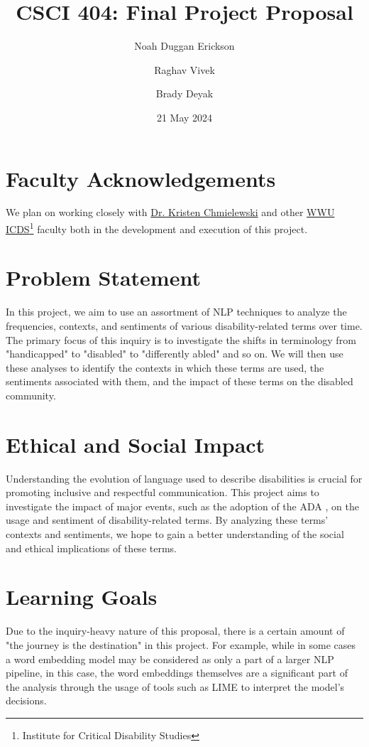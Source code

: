 \documentclass[letterpaper, twoside]{article}
\title{CSCI 404: Final Project Proposal}
\author{Noah Duggan Erickson \and Raghav Vivek \and Brady Deyak}
\date{21 May 2024}
\begin{document}
\maketitle

\section*{Faculty Acknowledgements}
We plan on working closely with \href{https://chss.wwu.edu/chmielk}{Dr. Kristen Chmielewski} and other \href{https://wp.wwu.edu/disabilitycollaborative/people/}{WWU ICDS\footnote{Institute for Critical Disability Studies} faculty} both in the development and execution of this project.

\section{Problem Statement}
In this project, we aim to use an assortment of NLP techniques to analyze the frequencies, contexts, and sentiments of various disability-related terms over time. The primary focus of this inquiry is to investigate the shifts in terminology from "handicapped" to "disabled" to "differently abled" and so on. We will then use these analyses to identify the contexts in which these terms are used, the sentiments associated with them, and the impact of these terms on the disabled community.
\section{Ethical and Social Impact}
Understanding the evolution of language used to describe disabilities is crucial for promoting inclusive and respectful communication. This project aims to investigate the impact of major events, such as the adoption of the ADA \cite{grey-ada}, on the usage and sentiment of disability-related terms. By analyzing these terms' contexts and sentiments, we hope to gain a better understanding of the social and ethical implications of these terms.
\section{Learning Goals}
Due to the inquiry-heavy nature of this proposal, there is a certain amount of "the journey is the destination" in this project. For example, while in some cases a word embedding model may be considered as only a part of a larger NLP pipeline, in this case, the word embeddings themselves are a significant part of the analysis through the usage of tools such as LIME \cite{lime} to interpret the model's decisions.
\end{document}
